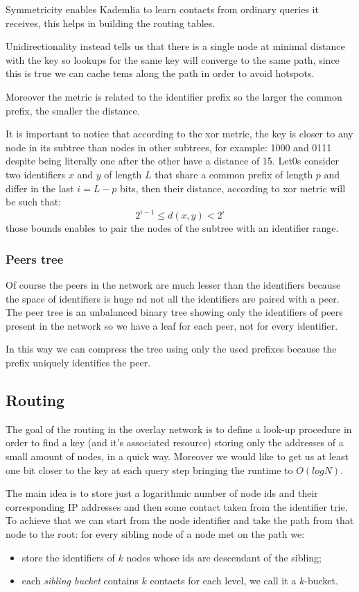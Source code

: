 Symmetricity enables Kademlia to learn contacts from ordinary queries it receives, this helps in building the routing tables.

Unidirectionality instead tells us that there is a single node at minimal distance with the key so lookups for the same key will converge to the same path, since this is true we can cache tems along the path in order to avoid hotspots.

Moreover the metric is related to the identifier prefix so the larger the common prefix, the smaller the distance.

It is important to notice that according to the xor metric, the key is closer to any node in its subtree than nodes in other subtrees, for example: 1000 and 0111 despite being literally one after the other have a distance of 15.
Let0s consider two identifiers $x$ and $y$ of length $L$ that share a common prefix of length $p$ and differ in the last $i=L-p$ bits, then their distance, according to xor metric will be such that:
$$
    2^{i-1} \leq d(x,y) < 2^i
$$
those bounds enables to pair the nodes of the subtree with an identifier range.

\subsubsection{Peers tree}
Of course the peers in the network are much lesser than the identifiers because the space of identifiers is huge nd not all the identifiers are paired with a peer.
The peer tree is an unbalanced binary tree showing only the identifiers of peers present in the network so we have a leaf for each peer, not for every identifier.

In this way we can compress the tree using only the used prefixes because the prefix uniquely identifies the peer.

\subsection{Routing}
The goal of the routing in the overlay network is to define a look-up procedure in order to find a key (and it's associated resource) storing only the addresses of a small amount of nodes, in a quick way.
Moreover we would like to get us at least one bit closer to the key at each query step bringing the runtime to $O(log N)$.

The main idea is to store just a logarithmic number of node ids and their corresponding IP addresses and then some contact taken from the identifier trie.
To achieve that we can start from the node identifier and take the path from that node to the root: for every sibling node of a node met on the path we:
\begin{itemize}
    \item store the identifiers of $k$ nodes whose ids are descendant of the sibling;
    \item each \emph{sibling bucket} contains $k$ contacts for each level, we call it a $k$-bucket.
\end{itemize}

